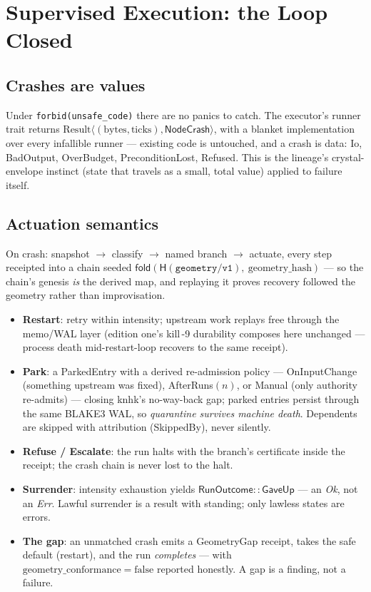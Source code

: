 \documentclass[11pt,a4paper]{article}
\theoremstyle{definition}
\theoremstyle{remark}
\newcommand{\HB}{\mathsf{H}}            %
\newcommand{\fold}{\mathsf{fold}}
\begin{document}
\section{Supervised Execution: the Loop Closed}

\subsection{Crashes are values}

Under \texttt{forbid(unsafe\_code)} there are no panics to catch. The
executor's runner trait returns
$\mathrm{Result}\langle(\mathrm{bytes},\mathrm{ticks}),
\mathsf{NodeCrash}\rangle$, with a blanket implementation over every
infallible runner --- existing code is untouched, and a crash is data:
\textsf{Io}, \textsf{BadOutput}, \textsf{OverBudget},
\textsf{PreconditionLost}, \textsf{Refused}. This is the lineage's
crystal-envelope instinct (state that travels as a small, total value)
applied to failure itself.

\subsection{Actuation semantics}

On crash: snapshot $\to$ classify $\to$ named branch $\to$ actuate, every
step receipted into a chain seeded
$\fold(\HB(\texttt{geometry/v1}),\ \mathrm{geometry\_hash})$ --- so the
chain's genesis \emph{is} the derived map, and replaying it proves
recovery followed the geometry rather than improvisation.

\begin{itemize}[leftmargin=1.6em]
\item \textbf{Restart}: retry within intensity; upstream work replays free
through the memo/WAL layer (edition one's kill\,-9 durability composes
here unchanged --- process death mid-restart-loop recovers to the same
receipt).
\item \textbf{Park}: a \textsf{ParkedEntry} with a derived re-admission
policy --- \textsf{OnInputChange} (something upstream was fixed),
\textsf{AfterRuns}$(n)$, or \textsf{Manual} (only authority re-admits) ---
closing knhk's no-way-back gap; parked entries persist through the same
BLAKE3 WAL, so \emph{quarantine survives machine death}. Dependents are
skipped with attribution (\textsf{SkippedBy}), never silently.
\item \textbf{Refuse / Escalate}: the run halts with the branch's
certificate inside the receipt; the crash chain is never lost to the
halt.
\item \textbf{Surrender}: intensity exhaustion yields
$\mathsf{RunOutcome{::}GaveUp}$ --- an \emph{Ok}, not an \emph{Err}.
Lawful surrender is a result with standing; only lawless states are
errors.
\item \textbf{The gap}: an unmatched crash emits a \textsf{GeometryGap}
receipt, takes the safe default (restart), and the run \emph{completes}
--- with $\mathrm{geometry\_conformance} = \mathrm{false}$ reported
honestly. A gap is a finding, not a failure.
\end{itemize}
\end{document}
